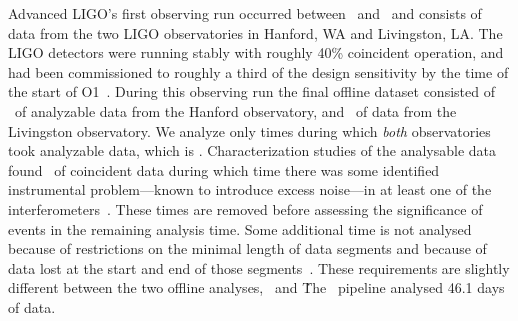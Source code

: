 Advanced \ac{LIGO}'s first observing run occurred between \OoneSTART\ and \OoneEND\
and consists of data from the two \ac{LIGO} observatories in Hanford, WA and Livingston, LA.
The LIGO detectors were running stably with roughly 40\% coincident operation, and had
been commissioned to roughly a third of the design sensitivity by the time of the start of O1~\citep{Martynov:2016fzi}.
During this observing run the final offline dataset consisted of \OoneOfflineAnalysableHTimeSeconds\
of analyzable data from the Hanford observatory, and \OoneOfflineAnalysableLTimeSeconds\ of data from the
Livingston observatory. We analyze only times during which \emph{both} observatories
took analyzable data, which is \OoneOfflineAnalysableTimeSeconds. Characterization studies of the analysable
data found \OoneOfflineAnalysableCatTwoDiffSeconds\ of coincident data during which time
there was some identified instrumental problem---known to
introduce excess noise---in at least one of the interferometers~\citep{TheLIGOScientific:2016zmo}.
These times are removed before assessing the significance of events
in the remaining analysis time. Some additional time is not analysed because
of restrictions on the minimal length of data segments and because of data lost
at the start and end of those segments~\citep{TheLIGOScientific:2016qqj, TheLIGOScientific:2016pea}.
These requirements are slightly different between the two offline analyses, \pycbc\ and \gstlal\. The \pycbc\
pipeline analysed 46.1 days of data.

